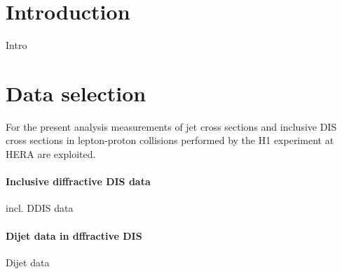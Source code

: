 \documentclass[12pt]{article}
\begin{document}
\section{Introduction}
Intro



\section{Data selection}
For the present analysis measurements of jet cross sections and inclusive DIS cross sections in
lepton-proton collisions performed by the H1 experiment at HERA are exploited.

\paragraph{Inclusive diffractive DIS data}
incl. DDIS data

\paragraph{Dijet data in dffractive DIS}
Dijet data
\end{document}
